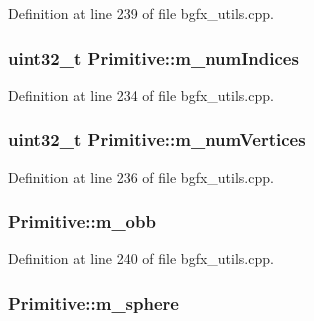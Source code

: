 Definition at line 239 of file bgfx\+\_\+utils.\+cpp.

\hypertarget{struct_primitive_a9e3e819abe78ce0985035f05f7da7188}{
\subsubsection[{m\+\_\+num\+Indices}]{\setlength{\rightskip}{0pt plus 5cm}uint32\+\_\+t Primitive\+::m\+\_\+num\+Indices}}\label{struct_primitive_a9e3e819abe78ce0985035f05f7da7188}


Definition at line 234 of file bgfx\+\_\+utils.\+cpp.

\hypertarget{struct_primitive_ad3f80b4cf1ff628aaf15d8d3fcb72eb8}{
\subsubsection[{m\+\_\+num\+Vertices}]{\setlength{\rightskip}{0pt plus 5cm}uint32\+\_\+t Primitive\+::m\+\_\+num\+Vertices}}\label{struct_primitive_ad3f80b4cf1ff628aaf15d8d3fcb72eb8}


Definition at line 236 of file bgfx\+\_\+utils.\+cpp.

\hypertarget{struct_primitive_ab3b2dc953998acdb9e644c98790ba9d9}{
\subsubsection[{m\+\_\+obb}]{ Primitive\+::m\+\_\+obb}}\label{struct_primitive_ab3b2dc953998acdb9e644c98790ba9d9}


Definition at line 240 of file bgfx\+\_\+utils.\+cpp.

\hypertarget{struct_primitive_ab10e85804e536da2653fa59c25fe5a31}{
\subsubsection[{m\+\_\+sphere}]{ Primitive\+::m\+\_\+sphere}}\label{struct_primitive_ab10e85804e536da2653fa59c25fe5a31}


